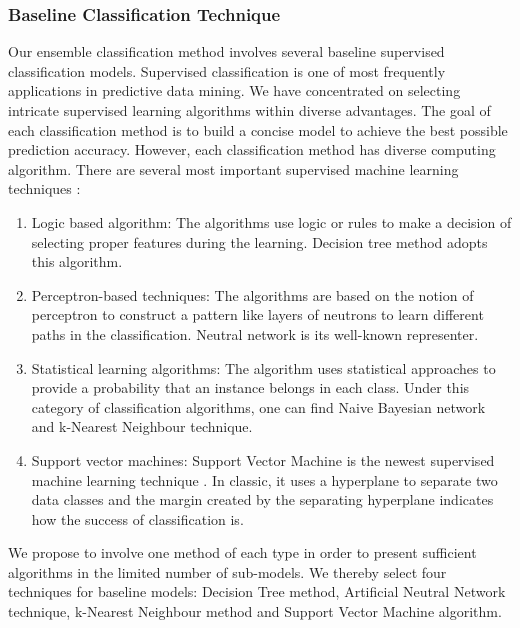 \documentclass[12pt]{article}
\begin{document}
\subsubsection{Baseline Classification Technique}
Our ensemble classification method involves several baseline supervised classification models. Supervised classification is one of most frequently applications in predictive data mining. We have concentrated on selecting intricate supervised learning algorithms within diverse advantages. The goal of each classification method is to build a concise model to achieve the best possible prediction accuracy. However, each classification method has diverse computing algorithm. There are several most important supervised machine learning techniques \cite{Kotsiantis}:\\
\begin{enumerate}[label=\alph*)]
	\item Logic based algorithm: The algorithms use logic or rules to make a decision of selecting proper features during the learning. Decision tree method adopts this algorithm.
	\item Perceptron-based techniques: The algorithms are based on the notion of perceptron to construct a pattern like layers of neutrons to learn different paths in the classification. Neutral network is its well-known representer.
	\item Statistical learning algorithms: The algorithm uses statistical approaches to provide a probability that an instance belongs in each class. Under this category of classification algorithms, one can find Naive Bayesian network and k-Nearest Neighbour technique.
	\item Support vector machines: Support Vector Machine is the newest supervised machine learning technique \cite{Kotsiantis}. In classic, it uses a hyperplane to separate two data classes and the margin created by the separating hyperplane indicates how the success of classification is. \\
\end{enumerate}

We propose to involve one method of each type in order to present sufficient algorithms in the limited number of sub-models. We thereby select four techniques for baseline models: Decision Tree method, Artificial Neutral Network technique, k-Nearest Neighbour method and Support Vector Machine algorithm.
\\
\end{document}
